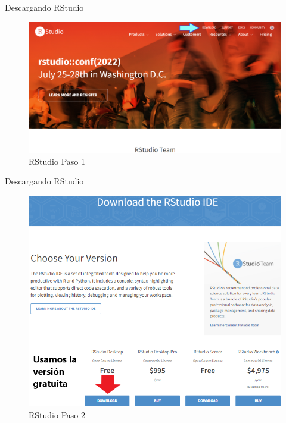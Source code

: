 \documentclass[
  13pt,
  ignorenonframetext,
]{beamer}
\begin{document}
\begin{frame}{Descargando RStudio}
\label{descargando-rstudio}
\begin{figure}[H]
\centering
\includegraphics[keepaspectratio,width=\textwidth, height=.8\textheight]{input/img/img1_5.png}
\caption{RStudio Paso 1}\label{rstudiopaso1}
\end{figure}
\end{frame}

\begin{frame}{Descargando RStudio}
\label{descargando-rstudio-1}
\begin{figure}[H]
\centering
\includegraphics[keepaspectratio,width=\textwidth, height=.8\textheight]{input/img/img1_6.png}
\caption{RStudio Paso 2}\label{rstudiopaso2}
\end{figure}
\end{frame}
\end{document}
